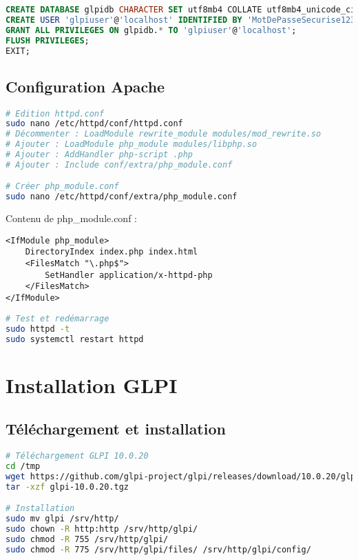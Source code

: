 \documentclass[12pt,a4paper]{article}
\begin{document}
\begin{lstlisting}[language=sql]
CREATE DATABASE glpidb CHARACTER SET utf8mb4 COLLATE utf8mb4_unicode_ci;
CREATE USER 'glpiuser'@'localhost' IDENTIFIED BY 'MotDePasseSecurise123!';
GRANT ALL PRIVILEGES ON glpidb.* TO 'glpiuser'@'localhost';
FLUSH PRIVILEGES;
EXIT;
\end{lstlisting}

\subsection{Configuration Apache}
\begin{lstlisting}[language=bash]
# Edition httpd.conf
sudo nano /etc/httpd/conf/httpd.conf
# Décommenter : LoadModule rewrite_module modules/mod_rewrite.so
# Ajouter : LoadModule php_module modules/libphp.so
# Ajouter : AddHandler php-script .php
# Ajouter : Include conf/extra/php_module.conf

# Créer php_module.conf
sudo nano /etc/httpd/conf/extra/php_module.conf
\end{lstlisting}

Contenu de php\_module.conf :
\begin{lstlisting}
<IfModule php_module>
    DirectoryIndex index.php index.html
    <FilesMatch "\.php$">
        SetHandler application/x-httpd-php
    </FilesMatch>
</IfModule>
\end{lstlisting}

\begin{lstlisting}[language=bash]
# Test et redémarrage
sudo httpd -t
sudo systemctl restart httpd
\end{lstlisting}

\section{Installation GLPI}

\subsection{Téléchargement et installation}
\begin{lstlisting}[language=bash]
# Téléchargement GLPI 10.0.20
cd /tmp
wget https://github.com/glpi-project/glpi/releases/download/10.0.20/glpi-10.0.20.tgz
tar -xzf glpi-10.0.20.tgz

# Installation
sudo mv glpi /srv/http/
sudo chown -R http:http /srv/http/glpi/
sudo chmod -R 755 /srv/http/glpi/
sudo chmod -R 775 /srv/http/glpi/files/ /srv/http/glpi/config/
\end{lstlisting}
\end{document}
